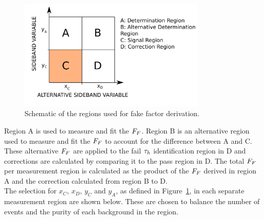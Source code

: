 \begin{figure}[!hbtp]
\centering
    \includegraphics[width=0.8\textwidth]{Figures/ff_diagram_v2.pdf}
\caption[Diagram of the regions used for fake factor derivation.]{Schematic of the regions used for fake factor derivation.}
\label{fig:ff_schematic}
\end{figure}

Region A is used to measure and fit the $F_{F}$.
Region B is an alternative region used to measure and fit the $F_{F}$ to account for the difference between A and C.
These alternative $F_{F}$ are applied to the fail $\tau_{h}$ identification region in D and corrections are calculated by comparing it to the pass region in D.
The total $F_{F}$ per measurement region is calculated as the product of the $F_{F}$ derived in region A and the correction calculated from region B to D. \\

The selection for $x_C$, $x_D$, $y_C$ and $y_A$, as defined in Figure~\ref{fig:ff_schematic}, in each separate measurement region are shown below.
These are chosen to balance the number of events and the purity of each background in the region.


